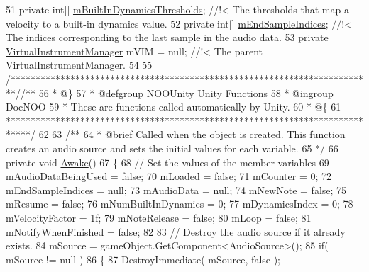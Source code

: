 \begin{DoxyCodeInclude}
51 \textcolor{comment}{}    \textcolor{keyword}{private} \textcolor{keywordtype}{int}[]                      \hyperlink{group___n_o_o_priv_var_ga6a530f5e624caf8087c636df98d7f0b0}{mBuiltInDynamicsThresholds}; \textcolor{comment}{//!< The
       thresholds that map a velocity to a built-in dynamics value.}
52 \textcolor{comment}{}    \textcolor{keyword}{private} \textcolor{keywordtype}{int}[]                      \hyperlink{group___n_o_o_priv_var_ga48c676306790f40714072cd6a81a0128}{mEndSampleIndices}; \textcolor{comment}{//!< The indices corresponding
       to the last sample in the audio data.}
53 \textcolor{comment}{}    \textcolor{keyword}{private} \hyperlink{class_virtual_instrument_manager}{VirtualInstrumentManager}   mVIM = null; \textcolor{comment}{//!< The parent
       VirtualInstrumentManager.}
54 \textcolor{comment}{}
55     \textcolor{comment}{/*************************************************************************/}\textcolor{comment}{/** }
56 \textcolor{comment}{    * @\}}
57 \textcolor{comment}{    * @defgroup NOOUnity Unity Functions}
58 \textcolor{comment}{    * @ingroup DocNOO}
59 \textcolor{comment}{    * These are functions called automatically by Unity.}
60 \textcolor{comment}{    * @\{}
61 \textcolor{comment}{    *****************************************************************************/}
62 \textcolor{comment}{}
63 \textcolor{comment}{    /**}
64 \textcolor{comment}{     * @brief Called when the object is created. This function creates an audio source and sets the initial
       values for each variable.}
65 \textcolor{comment}{    */}
66     \textcolor{keyword}{private} \textcolor{keywordtype}{void} \hyperlink{group___n_o_o_unity_ga5c3cd343b7bfe7dec693d2cb69ec3cce}{Awake}()
67     \{
68         \textcolor{comment}{// Set the values of the member variables}
69         mAudioDataBeingUsed = \textcolor{keyword}{false};
70         mLoaded = \textcolor{keyword}{false};
71         mCounter = 0;
72         mEndSampleIndices = null;
73         mAudioData = null;
74         mNewNote = \textcolor{keyword}{false};
75         mResume = \textcolor{keyword}{false};
76         mNumBuiltInDynamics = 0;
77         mDynamicsIndex = 0;
78         mVelocityFactor = 1f;
79         mNoteRelease = \textcolor{keyword}{false};
80         mLoop = \textcolor{keyword}{false};
81         mNotifyWhenFinished = \textcolor{keyword}{false};
82 
83         \textcolor{comment}{// Destroy the audio source if it already exists.}
84         mSource = gameObject.GetComponent<AudioSource>();
85         \textcolor{keywordflow}{if}( mSource != null )
86         \{
87             DestroyImmediate( mSource, \textcolor{keyword}{false} );

\end{DoxyCodeInclude}

